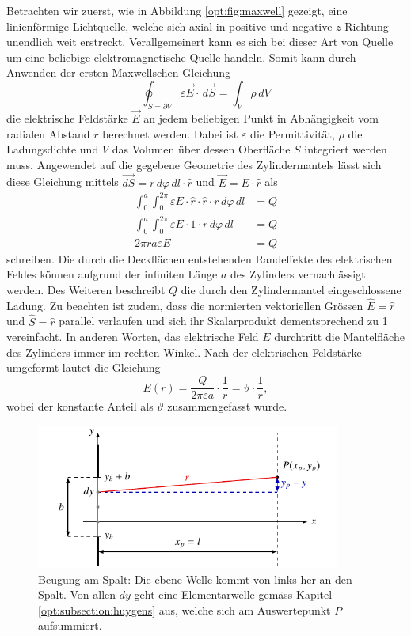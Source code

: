 Betrachten wir zuerst, wie in Abbildung \ref{opt:fig:maxwell} gezeigt, eine linienförmige Lichtquelle, welche sich axial in positive und negative $z$-Richtung unendlich weit erstreckt.
Verallgemeinert kann es sich bei dieser Art von Quelle um eine beliebige elektromagnetische Quelle handeln.
Somit kann durch Anwenden der ersten Maxwellschen Gleichung
\begin{equation*}
\oint_{S=\partial V} \varepsilon\vec{E} \cdot\, d\vec{S}
=
\int_{V}\rho\, dV
\end{equation*}
die elektrische Feldstärke $\vec{E}$ an jedem beliebigen Punkt in Abhängigkeit vom radialen Abstand $r$ berechnet werden.
Dabei ist $\varepsilon$ die Permittivität, $\rho$ die Ladungsdichte und $V$ das Volumen über dessen Oberfläche $S$ integriert werden muss.
Angewendet auf die gegebene Geometrie des Zylindermantels lässt sich diese Gleichung mittels $\vec{dS} = r\, d\varphi\, dl \cdot \hat{r}$ und $\vec{E} = E \cdot \hat{r}$ als
\begin{align*}
\int_{0}^{a}\int_{0}^{2\pi} \varepsilon E\cdot \hat{r} \cdot \hat{r} \cdot r\, d\varphi\, dl
&=
Q
\\
\int_{0}^{a}\int_{0}^{2\pi} \varepsilon E\cdot 1 \cdot r\, d\varphi\, dl
&=
Q
\\
2\pi ra\varepsilon E
&=
Q
\end{align*}
schreiben.
Die durch die Deckflächen entstehenden Randeffekte des elektrischen Feldes können aufgrund der infiniten Länge $a$ des Zylinders vernachlässigt werden.
Des Weiteren beschreibt $Q$ die durch den Zylindermantel eingeschlossene Ladung.
Zu beachten ist zudem, dass die normierten vektoriellen Grössen $\hat{E} = \hat{r}$ und $\hat{S} = \hat{r}$ parallel verlaufen und sich ihr Skalarprodukt dementsprechend zu 1 vereinfacht.
In anderen Worten, das elektrische Feld $E$ durchtritt die Mantelfläche des Zylinders immer im rechten Winkel.
Nach der elektrischen Feldstärke umgeformt lautet die Gleichung
\begin{equation}
E(r)
=
\frac{Q}{2\pi\varepsilon a} \cdot \frac{1}{r}
=
\vartheta \cdot \frac{1}{r}
,
\label{opt:equation:electric_field}
\end{equation}
wobei der konstante Anteil als $\vartheta$ zusammengefasst wurde.

\begin{figure}
    \centering
    \includegraphics[width=100mm]{papers/opt/images/derivation.pdf}
    \caption{Beugung am Spalt: Die ebene Welle kommt von links her an den Spalt. 
    Von allen $dy$ geht eine Elementarwelle gemäss Kapitel \ref{opt:subsection:huygens} aus, welche sich am Auswertepunkt $P$ aufsummiert.}
    \label{opt:fig:geometricalShape}
\end{figure}

